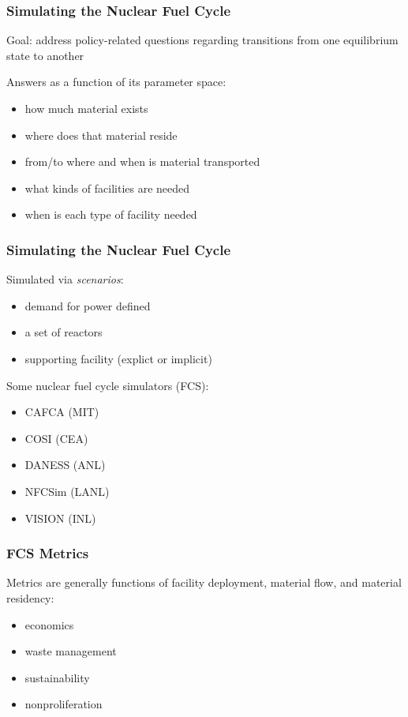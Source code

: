 
\begin{frame}[ctb!]
  \frametitle{Simulating the Nuclear Fuel Cycle} 

  Goal: address policy-related questions regarding transitions from one
  equilibrium state to another

  \vspace{0.2cm}
  
  Answers as a function of its parameter space:
  \begin{itemize}
    \item how much material exists
    \item where does that material reside
    \item from/to where and when is material transported
    \item what kinds of facilities are needed
    \item when is each type of facility needed
  \end{itemize}
\end{frame}

\begin{frame}[ctb!]
  \frametitle{Simulating the Nuclear Fuel Cycle}
  Simulated via \textit{scenarios}:
  \begin{itemize}
    \item demand for power defined
    \item a set of reactors
    \item supporting facility (explict or implicit)
  \end{itemize}

  \vspace{0.2cm}
  
  Some nuclear fuel cycle simulators (FCS):
  \begin{itemize}
    \item CAFCA (MIT) \cite{busquim_e_silva_system_2008}
    \item COSI (CEA) \cite{boucher_cosi:_2006}
    \item DANESS (ANL) \cite{durpel_daness_2003}
    \item NFCSim (LANL) \cite{schneider_nfcsim:_2005}
    \item VISION (INL) \cite{yacout_vision_2006}
  \end{itemize}
\end{frame}

\begin{frame}[ctb!]
  \frametitle{FCS Metrics}

  Metrics are generally functions of facility deployment, material flow, and
  material residency:

  \begin{itemize}
    \item economics
    \item waste management
    \item sustainability
    \item nonproliferation
  \end{itemize}
\end{frame}


